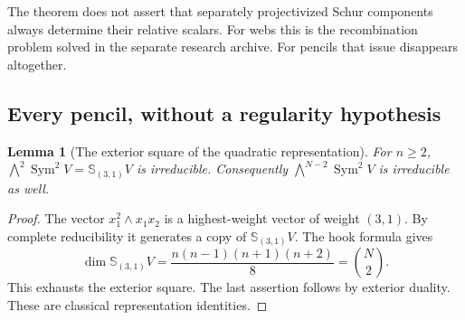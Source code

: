 \documentclass[11pt,reqno]{amsart}
\numberwithin{equation}{section}
\newtheorem{lemma}[theorem]{Lemma}
\theoremstyle{definition}\newtheorem{definition}[theorem]{Definition}
\theoremstyle{remark}\newtheorem{remark}[theorem]{Remark}
\DeclareMathOperator{\Sym}{Sym}\DeclareMathOperator{\Gr}{Gr}
\begin{document}
The theorem does not assert that separately projectivized Schur
components always determine their relative scalars.  For webs this
is the recombination problem solved in the separate research archive.  For pencils that issue
disappears altogether.

\subsection{Every pencil, without a regularity hypothesis}

\begin{lemma}[The exterior square of the quadratic representation]
\label{lem:pencil-irreducibility}
For \(n\ge2\), \(\bigwedge^2\Sym^2V=\mathbb S_{(3,1)}V\)
is irreducible.  Consequently
\(\bigwedge^{N-2}\Sym^2V\) is irreducible as well.
\end{lemma}
\begin{proof}
The vector \(x_1^2\wedge x_1x_2\) is a highest-weight vector of
weight \((3,1)\).  By complete reducibility it generates a copy of
\(\mathbb S_{(3,1)}V\).  The hook formula gives
\[
 \dim\mathbb S_{(3,1)}V
   =\frac{n(n-1)(n+1)(n+2)}8
   =\binom{N}{2}.
\]
This exhausts the exterior square.  The last assertion follows by
exterior duality.  These are classical representation identities.
\end{proof}
\end{document}
